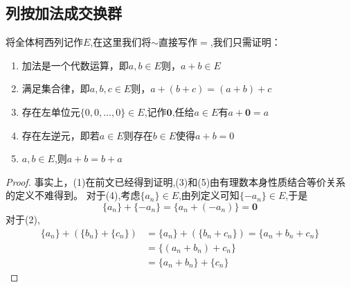 \documentclass[12pt, a4paper, oneside]{ctexart}
\begin{document}
\subsection{列按加法成交换群}
将全体柯西列记作$E$,在这里我们将$\sim$直接写作$=$,我们只需证明：
\begin{enumerate}[(1)]
    \item 加法是一个代数运算，即$a,b\in E$则，$a+b\in E$
    \item 满足集合律，即$a,b,c\in E$则，$a+(b+c)=(a+b)+c$
    \item 存在左单位元$\{ 0,0,\dots,0\}\in E$,记作$\textbf{0}$,任给$a\in E$有$a+\textbf{0}=a$
    \item 存在左逆元，即若$a\in E$则存在$b\in E$使得$a+b=0$
    \item $a,b\in E$,则$a+b=b+a$
\end{enumerate}
\begin{proof}
    事实上，(1)在前文已经得到证明,(3)和(5)由有理数本身性质结合等价关系的定义不难得到。
    对于(4),考虑$\{a_{n}\}\in E$,由列定义可知$\{-a_{n}\}\in E$,于是
    \begin{equation*}
        \{a_{n}\}+\{-a_{n}\}=\{a_{n}+(-a_{n})\}=\textbf{0}
    \end{equation*}
    对于(2),
    \begin{align*}
        \{a_{n}\}+(\{b_{n}\}+\{c_{n}\}) & =\{a_{n}\}+(\{b_{n}+c_{n}\})=\{a_{n}+b_{n}+c_{n}\} \\
                                        & =\{(a_{n}+b_{n})+c_{n}\}                           \\
                                        & =\{a_{n}+b_{n}\}+\{c_{n}\}
    \end{align*}
\end{proof}
\end{document}
